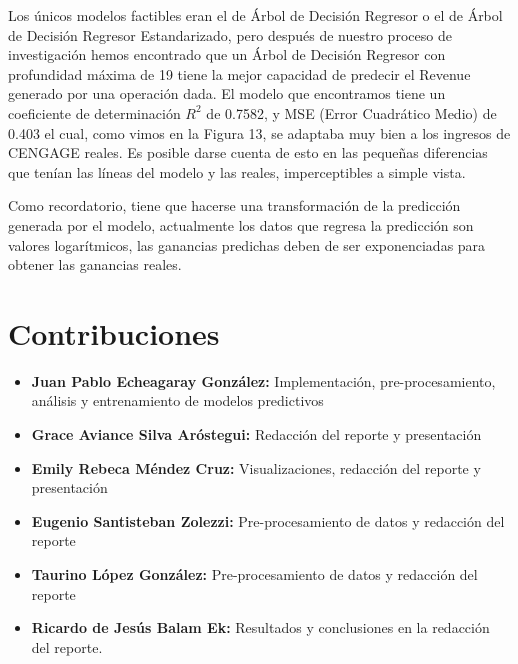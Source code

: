 \documentclass{article}
\begin{document}
        Los únicos modelos factibles eran el de Árbol de Decisión Regresor o el de Árbol de Decisión Regresor Estandarizado, pero después de nuestro proceso de investigación hemos encontrado que un Árbol de Decisión Regresor con profundidad máxima de 19 tiene la mejor capacidad de predecir el Revenue generado por una operación dada. El modelo que encontramos tiene un coeficiente de determinación $R^{2}$ de 0.7582, y MSE (Error Cuadrático Medio) de 0.403 el cual, como vimos en la Figura 13, se adaptaba muy bien a los ingresos de CENGAGE reales. Es posible darse cuenta de esto en las pequeñas diferencias que tenían las líneas del modelo y las reales, imperceptibles a simple vista.
        
        Como recordatorio, tiene que hacerse una transformación de la predicción generada por el modelo, actualmente los datos que regresa la predicción son valores logarítmicos, las ganancias predichas deben de ser exponenciadas para obtener las ganancias reales.

    \section{Contribuciones}
        \begin{itemize}
            \item \textbf{Juan Pablo Echeagaray González:} Implementación, pre-procesamiento, análisis y entrenamiento de modelos predictivos
            \item \textbf{Grace Aviance Silva Aróstegui:} Redacción del reporte y presentación
            \item \textbf{Emily Rebeca Méndez Cruz:} Visualizaciones, redacción del reporte y presentación
            \item \textbf{Eugenio Santisteban Zolezzi:} Pre-procesamiento de datos y redacción del reporte
            \item \textbf{Taurino López González:} Pre-procesamiento de datos y redacción del reporte
            \item \textbf{Ricardo de Jesús Balam Ek:} Resultados y  conclusiones en la redacción del reporte.
        \end{itemize}


    \clearpage
    \nocite{*}
    \printbibliography
\end{document}
